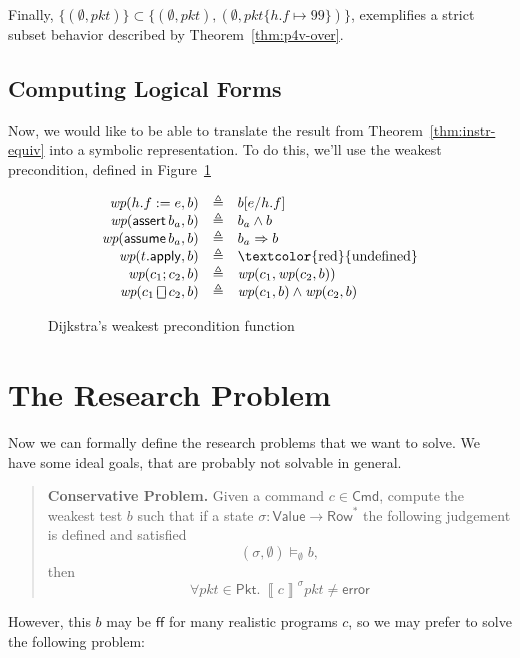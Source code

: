 \documentclass{article}
\newcommand{\pkt}{\mathit{pkt}}
\newcommand{\error}{\mathsf{error}}
\newcommand{\denote}[1]{\left\llbracket#1\right\rrbracket}
\newcommand{\FALSE}{\mathsf{ff}}
\newcommand{\Value}{\mathsf{Value}}
\newcommand{\Cmd}{\mathsf{Cmd}}
\newcommand{\Pkt}{\mathsf{Pkt}}
\newcommand{\Row}{\mathsf{Row}}
\newcommand{\assert}{\mathop{\mathsf{assert}}}
\newcommand{\assume}{\mathop{\mathsf{assume}}}
\newcommand{\apply}{\mathsf{apply}}
\newcommand{\choiceop}{\rotatebox[origin=c]{90}{$\sqsubset\!\!\!\sqsupset$}}
\newcommand{\choice}{\mathbin{\choiceop}}
\newcommand{\WP}{\textit{wp}}
\newcommand{\satisfy}[3]{({#1,#3}) \models_{#2}}
\begin{document}
Finally, $\{(\emptyset,\pkt)\} \subset
\{(\emptyset,\pkt),(\emptyset,\pkt\{h.f\mapsto 99\})\}$, exemplifies a strict
subset behavior described by Theorem~\ref{thm:p4v-over}.


\subsection{Computing Logical Forms}

Now, we would like to be able to translate the result from
Theorem~\ref{thm:instr-equiv} into a symbolic representation. To do this, we'll
use the weakest precondition, defined in Figure~\ref{fig:wp}

\begin{figure}[H]
  \[
  \begin{array}{r >{\triangleq}c l}
    \WP(h.f := e, b)
    && b[e/h.f] \\
    \WP(\assert b_a, b)
    && b_a \wedge b \\
    \WP(\assume b_a, b)
    && b_a \Rightarrow b \\
    \WP(t.\apply,b) && \textrm{\textcolor{red}{undefined}} \\
    \WP(c_1;c_2, b)
    && \WP(c_1,\WP(c_2,b)) \\
    \WP(c_1 \choice c_2, b)
    && \WP(c_1,b) \wedge \WP(c_2,b)
  \end{array}
  \]
  \caption{Dijkstra's weakest precondition function}
  \label{fig:wp}
\end{figure}






\section{The Research Problem}

Now we can formally define the research problems that we want to solve. We have
some ideal goals, that are probably not solvable in general.

\begin{quote}
  \textbf{Conservative Problem.} Given a command $c \in \Cmd$, compute the weakest test
  $b$ such that if a state $\sigma : \Value \to \Row^*$ the following
  judgement is defined and satisfied \[\satisfy\sigma\emptyset\emptyset b,\] then \[\forall \pkt \in \Pkt.~
  \denote{c}^\sigma \pkt \neq \error \]
\end{quote}

However, this $b$ may be $\FALSE$ for many realistic programs $c$, so we may
prefer to solve the following problem:
\end{document}
